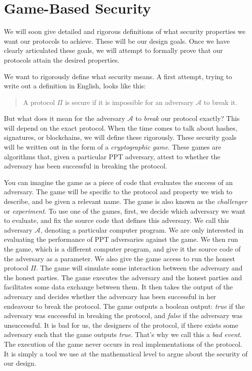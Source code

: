 \section{Game-Based Security}

We will soon give detailed and rigorous definitions of what security properties we want
our protocols to achieve. These will be our design goals. Once we have clearly articulated
these goals, we will attempt to formally prove that our protocols attain the desired properties.

We want to rigorously define what security means. A first attempt, trying to write out a definition
in English, looks like this:

\begin{quote}
  A protocol $\Pi$ is secure if it is impossible for an adversary $\mathcal{A}$ to
  break it.
\end{quote}

But what does it mean for the adversary $\mathcal{A}$ to \emph{break} our protocol exactly?
This will depend on the exact protocol. When the time comes to talk about hashes, signatures,
or blockchains, we will define these rigorously.
These security goals will be written out in the form of a \emph{cryptographic game}. These
games are algorithms that, given a particular PPT adversary, attest to whether the adversary
has been successful in breaking the protocol.

You can imagine the game as a piece of code that evaluates the success of an adversary.
The game will be specific to the protocol and property we wish to describe, and be given
a relevant name. The game is also known as the \emph{challenger} or \emph{experiment}.
To use one of the games, first,
we decide which adversary we want to evaluate, and fix the source code that defines this adversary.
We call this adversary
$\mathcal{A}$,
denoting a particular computer program.
We are only interested in evaluating the performance of PPT adversaries against the game.
We then run the
game, which is a different computer program, and give it the source code of the adversary as a
parameter. We also give the game access to run the honest protocol
$\Pi$.
The game will
simulate some interaction between the adversary and the honest parties. The game executes
the adversary and the honest parties and facilitates some data exchange between them. It
then takes the output of the adversary and decides whether the adversary has been successful
in her endeavour to break the protocol. The game outputs a boolean output: \emph{true}
if the adversary was successful in breaking the protocol, and \emph{false} if the adversary
was unsuccessful. It is bad for us, the designers of the protocol, if there exists some
adversary such that the game outputs \emph{true}. That's why we call this a \emph{bad event}.
The execution of the game never occurs
in real implementations of the protocol. It is simply a tool we use at the mathematical
level to argue about the security of our design.

